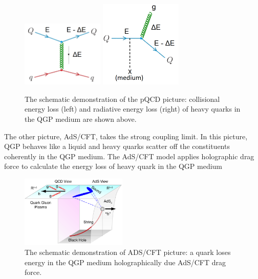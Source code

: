  \begin{figure}[hbtp]
\begin{center}
\includegraphics[width=0.35\textwidth]{Figures/Chapter1/Collisional.png}
\includegraphics[width=0.35\textwidth]{Figures/Chapter1/Radiative.png}
\caption{The schematic demonstration of the pQCD picture: collisional energy loss (left) and radiative energy loss (right) of heavy quarks in the QGP medium are shown above.}
\label{HQELosspQCD}
\end{center}
\end{figure}   

The other picture, AdS/CFT, takes the strong coupling limit. In this picture, QGP behaves like a liquid and heavy quarks scatter off the constituents coherently in the QGP medium. The AdS/CFT model applies holographic drag force \cite{ADSCFTDrag} to calculate the energy loss of heavy quark \cite{HQHoloELoss} in the QGP medium

 \begin{figure}[hbtp]
\begin{center}
\includegraphics[width=0.45\textwidth]{Figures/Chapter1/ADSCFT.png}
\caption{The schematic demonstration of ADS/CFT picture: a quark loses energy in the QGP medium holographically due AdS/CFT drag force.}
\label{ADCCFT}
\end{center}
\end{figure}  

